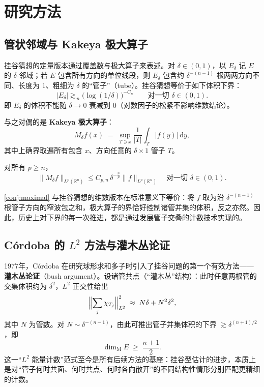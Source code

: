 \section{研究方法}\label{sec:methods}

\subsection{管状邻域与 Kakeya 极大算子}

挂谷猜想的定量版本通过覆盖数与极大算子来表述。对 $\delta \in (0,1)$，以 $E_\delta$ 记 $E$ 的 $\delta$-邻域；若 $E$ 包含所有方向的单位线段，则 $E_\delta$ 包含约 $\delta^{-(n-1)}$ 根两两方向不同、长度为 $1$、粗细为 $\delta$ 的“管子”（tube）。挂谷猜想等价于如下体积下界：
\begin{equation}\label{eq:volume-lower}
    \bigl| E_\delta \bigr| \gtrsim_{\,n} \bigl(\log (1/\delta)\bigr)^{-C_n} \qquad \text{对一切 } \delta \in (0,1).
\end{equation}
即 $E_\delta$ 的体积不能随 $\delta \to 0$ 衰减到 $0$（对数因子的松紧不影响维数结论）。

与之对偶的是 \textbf{Kakeya 极大算子}：
\begin{equation}
    M_\delta f(x) \;=\; \sup_{T \ni x} \frac{1}{|T|} \int_T |f(y)| \,\mathrm{d}y,
\end{equation}
其中上确界取遍所有包含 $x$、方向任意的 $\delta \times 1$ 管子 $T$。

\begin{conjecture}\label{conj:maximal}
    对所有 $p \ge n$，
    \begin{equation}
        \| M_\delta f \|_{L^p(\mathbb{R}^n)} \le C_{p,n} \, \delta^{-\frac{n}{p}} \|f\|_{L^p(\mathbb{R}^n)} \quad \text{对一切 } \delta \in (0,1).
    \end{equation}
\end{conjecture}

\cref{conj:maximal} 与挂谷猜想的维数版本在标准意义下等价：将 $f$ 取为沿 $\delta^{-(n-1)}$ 根管子方向的窄波包之和，极大算子的界恰好控制诸管并集的体积，反之亦然\cite{tao2001notices}。因此，历史上对下界的每一次推进，都是通过发展管子交叠的计数技术实现的。

\subsection{Córdoba 的 $L^2$ 方法与灌木丛论证}

1977年，Córdoba 在研究球形求和多子时引入了挂谷问题的第一个有效方法——\textbf{灌木丛论证}（bush argument）\cite{cordoba1977}。设诸管共点（“灌木丛”结构）：此时任意两根管的交集体积约为 $\delta^2$，$L^2$ 正交性给出
\begin{equation}
    \Bigl\| \sum_j \chi_{T_j} \Bigr\|_{L^2}^2 \;\approx\; N\delta + N^2 \delta^2,
\end{equation}
其中 $N$ 为管数。对 $N \sim \delta^{-(n-1)}$，由此可推出管子并集体积的下界 $\gtrsim \delta^{(n+1)/2}$，即
\begin{equation}
    \dim_{\mathrm{M}} E \;\ge\; \frac{n+1}{2}.
\end{equation}
这一“$L^2$ 能量计数”范式至今是所有后续方法的基座：挂谷型估计的进步，本质上是对“管子何时共面、何时共点、何时各向散开”的不同结构性情形分别匹配更精细的计数。

